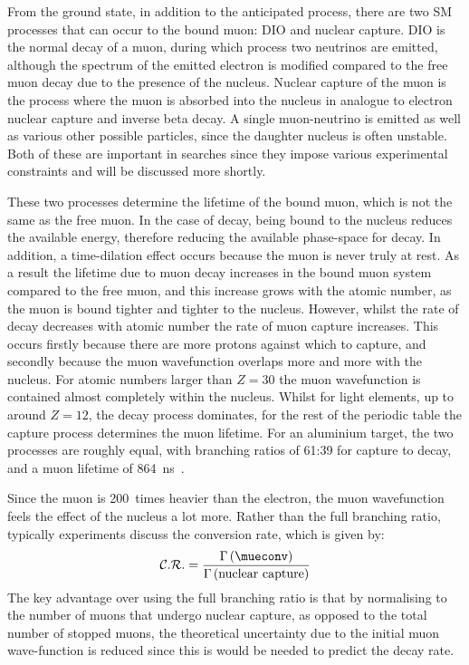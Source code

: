 From the ground state, in addition to the anticipated \mueconv process, there are two \ac{SM} processes that can occur to the bound muon:
\ac{DIO} and nuclear capture.
\ac{DIO} is the normal decay of a muon, during which process two neutrinos are emitted, although the spectrum of the emitted electron is modified compared to the free muon decay due to the presence of the nucleus.
Nuclear capture of the muon is the process where the muon is absorbed into the nucleus in analogue to electron nuclear capture and inverse beta decay.
A single muon-neutrino is emitted as well as various other possible particles, since the daughter nucleus is often unstable.
Both of these are important in \mueconv searches since they impose various experimental constraints and will be discussed more shortly.

These two processes determine the lifetime of the bound muon, which is not the same as the free muon.
In the case of decay, being bound to the nucleus reduces the available energy, therefore reducing the available phase-space for decay. 
In addition, a time-dilation effect occurs because the muon is never truly at rest. 
As a result the lifetime due to muon decay increases in the bound muon system compared to the free muon, and this increase grows with the atomic number, as the muon is bound tighter and tighter to the nucleus.
However, whilst the rate of decay decreases with atomic number the rate of muon capture increases.
This occurs firstly because there are more protons against which to capture, and secondly because the muon wavefunction overlaps more and more with the nucleus.
For atomic numbers larger than $Z=30$ the muon wavefunction is contained almost completely within the nucleus.
Whilst for light elements, up to around $Z=12$, the decay process dominates, for the rest of the periodic table the capture process determines the muon lifetime.
For an aluminium target, the two processes are roughly equal, with branching ratios of 61:39 for capture to decay, and a muon lifetime of 864~ns~\cite{Measday2007Comparison}.

Since the muon is 200~times heavier than the electron, the muon wavefunction feels the effect of the nucleus a lot more.
Rather than the full branching ratio, typically \mueconv experiments discuss the conversion rate, which is given by:
\begin{equation}
\mathcal{C.R.}=\frac{\Gamma\left(\mathrm{\mueconv}\right)}{\Gamma\left(\mathrm{nuclear~capture}\right)}
\end{equation}
The key advantage over using the full branching ratio is that by normalising to the number of muons that undergo nuclear capture, as opposed to the total number of stopped muons, the theoretical uncertainty due to the initial muon wave-function is reduced since this is would be needed to predict the decay rate.

